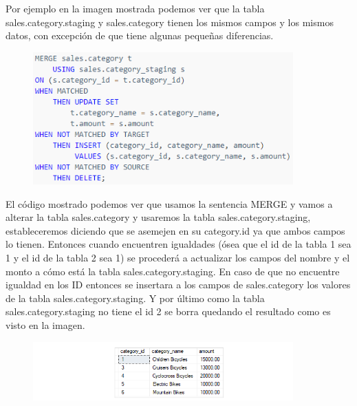 \documentclass[preprint,12pt]{elsarticle}
\begin{document}
Por ejemplo en la imagen mostrada podemos ver que la tabla sales.category.staging y sales.category tienen los mismos campos y los mismos datos, con excepción de que tiene algunas pequeñas diferencias.

\begin{figure}[htb]
	\begin{center}
		\includegraphics[width=10cm]{./IMAGENES/huichi5}
	\end{center}
\end{figure}

El código mostrado podemos ver que usamos la sentencia MERGE y vamos a alterar la tabla sales.category y usaremos la tabla sales.category.staging, estableceremos diciendo que se asemejen en su category.id ya que ambos campos lo tienen. Entonces cuando encuentren igualdades (ósea que el id de la tabla 1 sea 1 y el id de la tabla 2 sea 1) se procederá a actualizar los campos del nombre y el monto a cómo está la tabla sales.category.staging. En caso de que no encuentre igualdad en los ID entonces se insertara a los campos de sales.category los valores de la tabla sales.category.staging. Y por último como la tabla sales.category.staging no tiene el id 2 se borra quedando el resultado como es visto en la imagen.
\begin{figure}[htb]
	\begin{center}
		\includegraphics[width=10cm]{./IMAGENES/huichi4}
	\end{center}
\end{figure}
\end{document}
